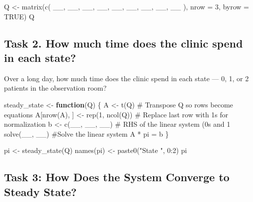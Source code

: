\documentclass[
]{article}
\newenvironment{Shaded}{\begin{snugshade}}{\end{snugshade}}
\newcommand{\AttributeTok}[1]{\textcolor[rgb]{0.40,0.45,0.13}{#1}}
\newcommand{\CommentTok}[1]{\textcolor[rgb]{0.37,0.37,0.37}{#1}}
\newcommand{\ConstantTok}[1]{\textcolor[rgb]{0.56,0.35,0.01}{#1}}
\newcommand{\ControlFlowTok}[1]{\textcolor[rgb]{0.00,0.23,0.31}{\textbf{#1}}}
\newcommand{\DecValTok}[1]{\textcolor[rgb]{0.68,0.00,0.00}{#1}}
\newcommand{\FunctionTok}[1]{\textcolor[rgb]{0.28,0.35,0.67}{#1}}
\newcommand{\NormalTok}[1]{\textcolor[rgb]{0.00,0.23,0.31}{#1}}
\newcommand{\OtherTok}[1]{\textcolor[rgb]{0.00,0.23,0.31}{#1}}
\newcommand{\SpecialCharTok}[1]{\textcolor[rgb]{0.37,0.37,0.37}{#1}}
\newcommand{\StringTok}[1]{\textcolor[rgb]{0.13,0.47,0.30}{#1}}
\begin{document}
\begin{Shaded}
\begin{Highlighting}[]
\NormalTok{Q }\OtherTok{\textless{}{-}} \FunctionTok{matrix}\NormalTok{(}\FunctionTok{c}\NormalTok{(}
\NormalTok{  \_\_, \_\_, \_\_,}
\NormalTok{  \_\_, \_\_, \_\_,}
\NormalTok{  \_\_, \_\_, \_\_}
\NormalTok{), }\AttributeTok{nrow =} \DecValTok{3}\NormalTok{, }\AttributeTok{byrow =} \ConstantTok{TRUE}\NormalTok{)}
\NormalTok{Q}
\end{Highlighting}
\end{Shaded}

\subsection{Task 2. How much time does the clinic spend in each
state?}\label{task-2.-how-much-time-does-the-clinic-spend-in-each-state}

Over a long day, how much time does the clinic spend in each state ---
0, 1, or 2 patients in the observation room?

\begin{Shaded}
\begin{Highlighting}[]
\NormalTok{steady\_state }\OtherTok{\textless{}{-}} \ControlFlowTok{function}\NormalTok{(Q) \{}
\NormalTok{  A }\OtherTok{\textless{}{-}} \FunctionTok{t}\NormalTok{(Q) }\CommentTok{\# Transpose Q so rows become equations}
\NormalTok{  A[}\FunctionTok{nrow}\NormalTok{(A), ] }\OtherTok{\textless{}{-}} \FunctionTok{rep}\NormalTok{(}\DecValTok{1}\NormalTok{, }\FunctionTok{ncol}\NormalTok{(Q))  }\CommentTok{\# Replace last row with 1s for normalization}
\NormalTok{  b }\OtherTok{\textless{}{-}} \FunctionTok{c}\NormalTok{(\_\_, \_\_, \_\_) }\CommentTok{\# RHS of the linear system (0s and 1}
  \FunctionTok{solve}\NormalTok{(\_\_, \_\_) }\CommentTok{\#Solve the linear system A * pi = b}
\NormalTok{\}}

\NormalTok{pi }\OtherTok{\textless{}{-}} \FunctionTok{steady\_state}\NormalTok{(Q)}
\FunctionTok{names}\NormalTok{(pi) }\OtherTok{\textless{}{-}} \FunctionTok{paste0}\NormalTok{(}\StringTok{"State "}\NormalTok{, }\DecValTok{0}\SpecialCharTok{:}\DecValTok{2}\NormalTok{)}
\NormalTok{pi}
\end{Highlighting}
\end{Shaded}

\subsection{Task 3: How Does the System Converge to Steady
State?}\label{task-3-how-does-the-system-converge-to-steady-state}
\end{document}

